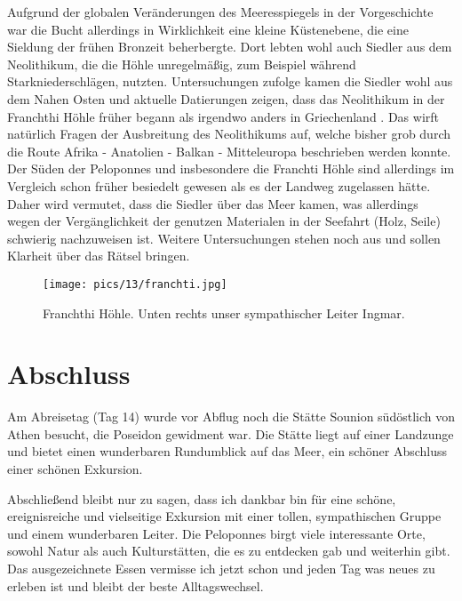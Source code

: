 \documentclass[preprint]{geomorphica} %
\begin{document}
Aufgrund der globalen Veränderungen des Meeresspiegels in der Vorgeschichte war die Bucht allerdings in Wirklichkeit eine kleine Küstenebene, die eine Sieldung der frühen Bronzeit beherbergte. Dort lebten wohl auch Siedler aus dem Neolithikum, die die Höhle unregelmäßig, zum Beispiel während Starkniederschlägen, nutzten. Untersuchungen zufolge kamen die Siedler wohl aus dem Nahen Osten und aktuelle Datierungen zeigen, dass das Neolithikum in der Franchthi Höhle früher begann als irgendwo anders in Griechenland \cite{Emery.Beck.ea2016}. Das wirft natürlich Fragen der Ausbreitung des Neolithikums auf, welche bisher grob durch die Route Afrika - Anatolien - Balkan - Mitteleuropa beschrieben werden konnte. Der Süden der Peloponnes und insbesondere die Franchti Höhle sind allerdings im Vergleich schon früher besiedelt gewesen als es der Landweg zugelassen hätte. Daher wird vermutet, dass die Siedler über das Meer kamen, was allerdings wegen der Vergänglichkeit der genutzen Materialen in der Seefahrt (Holz, Seile) schwierig nachzuweisen ist. Weitere Untersuchungen stehen noch aus und sollen Klarheit über das Rätsel bringen.

\begin{figure}[h]
    \centering
    \texttt{[image: pics/13/franchti.jpg]}
    \caption{Franchthi Höhle. Unten rechts unser sympathischer Leiter Ingmar.}
    \label{pic:franchti}
\end{figure}


\newpage

\section*{Abschluss}

Am Abreisetag (Tag 14) wurde vor Abflug noch die Stätte Sounion südöstlich von Athen besucht, die Poseidon gewidment war. Die Stätte liegt auf einer Landzunge und bietet einen wunderbaren Rundumblick auf das Meer, ein schöner Abschluss einer schönen Exkursion.

Abschließend bleibt nur zu sagen, dass ich dankbar bin für eine schöne, ereignisreiche und vielseitige Exkursion mit einer tollen, sympathischen Gruppe und einem wunderbaren Leiter. Die Peloponnes birgt viele interessante Orte, sowohl Natur als auch Kulturstätten, die es zu entdecken gab und weiterhin gibt. Das ausgezeichnete Essen vermisse ich jetzt schon und jeden Tag was neues zu erleben ist und bleibt der beste Alltagswechsel.
\end{document}
